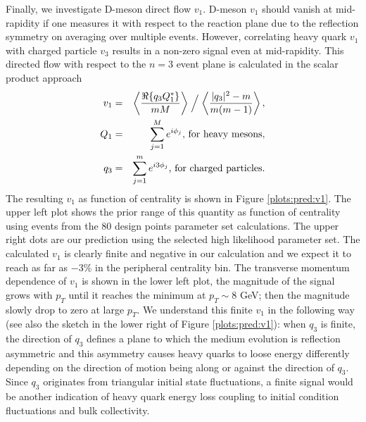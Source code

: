 \documentclass[aps, prc, reprint, amsmath, groupedaddress, nofootinbib]{revtex4-1}
\begin{document}
Finally, we investigate D-meson direct flow $v_1$.
D-meson $v_1$ should vanish at mid-rapidity if one measures it with respect to the reaction plane due to the reflection symmetry on averaging over multiple events.
However, correlating heavy quark $v_1$ with charged particle $v_3$ results in a non-zero signal even at mid-rapidity.
This directed flow with respect to the $n=3$ event plane is calculated in the scalar product approach
\begin{eqnarray}
v_1 &=& \left\langle \frac{\Re\{q_3 Q_1^*\}}{mM} \right\rangle\Bigm/\left\langle \frac{|q_3|^2-m}{m(m-1)} \right\rangle,\\
Q_1 &=& \sum_{j=1}^{M}e^{i\phi_j} \textrm{, for heavy mesons},\nonumber\\
q_3 &=& \sum_{j=1}^{m}e^{i3\phi_j} \textrm{, for charged particles}. \nonumber
\end{eqnarray}
The resulting $v_1$ as function of centrality is shown in Figure \ref{plots:pred:v1}.
The upper left plot shows the prior range of this quantity as function of centrality using events from the 80 design points parameter set calculations.
The upper right dots are our prediction using the selected high likelihood parameter set.
The calculated $v_1$ is clearly finite and negative in our calculation and we expect it to reach as far as $-3\%$ in the peripheral centrality bin.
The transverse momentum dependence of $v_1$ is shown in the lower left plot, the magnitude of the signal grows with $p_T$ until it reaches the minimum at $p_T \sim 8$ GeV; then the magnitude slowly drop to zero at large $p_T$.
We understand this finite $v_1$ in the following way
(see also the sketch in the lower right of Figure \ref{plots:pred:v1}):
when $q_3$ is finite, the direction of $q_3$ defines a plane to which the medium evolution is reflection asymmetric and this asymmetry causes heavy quarks to loose energy differently depending on the direction of motion being along or against the direction of $q_3$.
Since $q_3$ originates from triangular initial state fluctuations, a finite signal would be another indication of heavy quark energy loss coupling to initial condition fluctuations and bulk collectivity.
\end{document}

